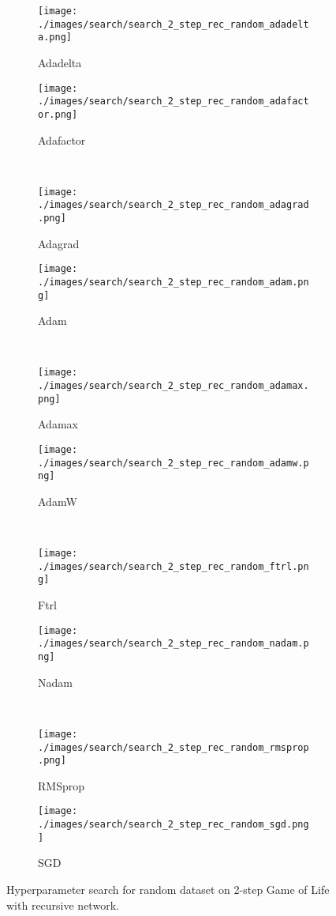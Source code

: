 \documentclass[letterpaper]{article} %
\begin{document}
\clearpage
\begin{figure*}[ht!]
    \centering
    \begin{subfigure}{.49\linewidth}
        \texttt{[image: ./images/search/search\_2\_step\_rec\_random\_adadelta.png]}
        \caption{Adadelta}
    \end{subfigure}
    \begin{subfigure}{.49\linewidth}
        \texttt{[image: ./images/search/search\_2\_step\_rec\_random\_adafactor.png]}
        \caption{Adafactor}
    \end{subfigure}
    \\
    \begin{subfigure}{.49\linewidth}
        \texttt{[image: ./images/search/search\_2\_step\_rec\_random\_adagrad.png]}
        \caption{Adagrad}
    \end{subfigure}
    \begin{subfigure}{.49\linewidth}
        \texttt{[image: ./images/search/search\_2\_step\_rec\_random\_adam.png]}
        \caption{Adam}
    \end{subfigure}
    \\
    \begin{subfigure}{.49\linewidth}
        \texttt{[image: ./images/search/search\_2\_step\_rec\_random\_adamax.png]}
        \caption{Adamax}
    \end{subfigure}
    \begin{subfigure}{.49\linewidth}
        \texttt{[image: ./images/search/search\_2\_step\_rec\_random\_adamw.png]}
        \caption{AdamW}
    \end{subfigure}
    \\
    \begin{subfigure}{.49\linewidth}
        \texttt{[image: ./images/search/search\_2\_step\_rec\_random\_ftrl.png]}
        \caption{Ftrl}
    \end{subfigure}
    \begin{subfigure}{.49\linewidth}
        \texttt{[image: ./images/search/search\_2\_step\_rec\_random\_nadam.png]}
        \caption{Nadam}
    \end{subfigure}
    \\
    \begin{subfigure}{.49\linewidth}
        \texttt{[image: ./images/search/search\_2\_step\_rec\_random\_rmsprop.png]}
        \caption{RMSprop}
    \end{subfigure}
    \begin{subfigure}{.49\linewidth}
        \texttt{[image: ./images/search/search\_2\_step\_rec\_random\_sgd.png]}
        \caption{SGD}
    \end{subfigure}
    \caption{Hyperparameter search for random dataset on 2-step Game of Life with recursive network.}
    \label{fig:search_2_rec_random}
\end{figure*}
\end{document}

